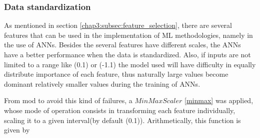 


\subsubsection{Data standardization}\label{chap3:subsubsec:data_standardization}

As mentioned in section \ref{chap3:subsec:feature_selection}, there are several features that can be used in the implementation of \ac{ML} methodologies, namely in the use of \ac{ANNs}. Besides the several features have different scales, the \ac{ANNs} have a better performance when the data is standardized. Also, if inputs are not limited to a range like (0.1) or (-1.1) the model used will have difficulty in equally distribute importance of each feature, thus naturally large values become dominant relatively smaller values during the training of \ac{ANNs}.

From mod to avoid this kind of failures, a $MinMaxScaler$ \ref{minmax} was applied, whose mode of operation consists in transforming each feature individually, scaling it to a given interval(by default (0.1)).  Arithmetically, this function is given by

